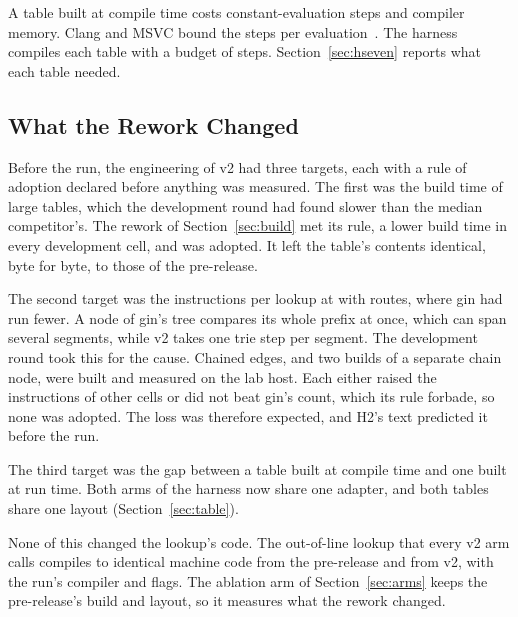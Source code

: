 A table built at compile time costs constant-evaluation steps and compiler memory. Clang and MSVC
bound the steps per evaluation~\cite{llvm2026clangmanual,microsoft2026constexpr}. The harness
compiles each table with a budget of \ConstexprSteps{} steps. Section~\ref{sec:hseven} reports
what each table needed.

\subsection{What the Rework Changed}\label{sec:rework}

Before the run, the engineering of v2 had three targets, each with a rule of adoption declared
before anything was measured. The first was the build time of large tables, which the development
round had found slower than the median competitor's. The rework of Section~\ref{sec:build} met
its rule, a lower build time in every development cell, and was adopted. It left the table's
contents identical, byte for byte, to those of the pre-release.

The second target was the instructions per lookup at  with \SizeTen{} routes,
where gin had run fewer. A node of gin's tree compares its whole prefix at once, which can span
several segments, while v2 takes one trie step per segment. The development round took this for the
cause. Chained edges, and two builds of a separate chain node, were built and measured on the lab
host. Each either raised the instructions of other cells or did not beat gin's count, which its rule
forbade, so none was adopted. The loss was therefore expected, and H2's text predicted it before the
run.

The third target was the gap between a table built at compile time and one built at run time. Both
arms of the harness now share one adapter, and both tables share one layout
(Section~\ref{sec:table}).

None of this changed the lookup's code. The out-of-line lookup that every v2 arm calls compiles to
identical machine code from the pre-release and from v2, with the run's compiler and flags. The
ablation arm of Section~\ref{sec:arms} keeps the pre-release's build and layout, so it measures what
the rework changed.

